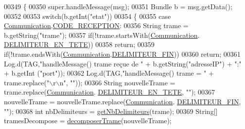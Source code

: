 \begin{DoxyCode}
00349         \{
00350             super.handleMessage(msg);
00351             Bundle b = msg.getData();
00352 
00353             \textcolor{keywordflow}{switch}(b.getInt(\textcolor{stringliteral}{"etat"}))
00354             \{
00355                 \textcolor{keywordflow}{case} \hyperlink{classcom_1_1lasalle_1_1meeting_1_1_communication}{Communication}.\hyperlink{classcom_1_1lasalle_1_1meeting_1_1_communication_a9cd85019614f2434af944c955519dfd1}{CODE\_RECEPTION}:
00356                     String trame = b.getString(\textcolor{stringliteral}{"trame"});
00357                     \textcolor{keywordflow}{if}(!trame.startsWith(\hyperlink{classcom_1_1lasalle_1_1meeting_1_1_communication}{Communication}.
      \hyperlink{classcom_1_1lasalle_1_1meeting_1_1_communication_a6560c39bb7ebc968e007e4dd98ec296c}{DELIMITEUR\_EN\_TETE}))
00358                         \textcolor{keywordflow}{return};
00359                     \textcolor{keywordflow}{if}(!trame.endsWith(\hyperlink{classcom_1_1lasalle_1_1meeting_1_1_communication}{Communication}.\hyperlink{classcom_1_1lasalle_1_1meeting_1_1_communication_a6f2e7cb2145496069cdf1b33d017be58}{DELIMITEUR\_FIN}))
00360                         \textcolor{keywordflow}{return};
00361                     Log.d(TAG,\textcolor{stringliteral}{"handleMessage() trame reçue de "} + b.getString(\textcolor{stringliteral}{"adresseIP"}) + \textcolor{stringliteral}{":"} + b.getInt
      (\textcolor{stringliteral}{"port"}));
00362                     Log.d(TAG,\textcolor{stringliteral}{"handleMessage() trame = "} + trame.replace(\textcolor{stringliteral}{"\(\backslash\)r\(\backslash\)n"}, \textcolor{stringliteral}{""}));
00366                     String nouvelleTrame = trame.replace(\hyperlink{classcom_1_1lasalle_1_1meeting_1_1_communication}{Communication}.
      \hyperlink{classcom_1_1lasalle_1_1meeting_1_1_communication_a6560c39bb7ebc968e007e4dd98ec296c}{DELIMITEUR\_EN\_TETE}, \textcolor{stringliteral}{""});
00367                     nouvelleTrame = nouvelleTrame.replace(\hyperlink{classcom_1_1lasalle_1_1meeting_1_1_communication}{Communication}.
      \hyperlink{classcom_1_1lasalle_1_1meeting_1_1_communication_a6f2e7cb2145496069cdf1b33d017be58}{DELIMITEUR\_FIN}, \textcolor{stringliteral}{""});
00368                     \textcolor{keywordtype}{int} nbDelimiteurs = \hyperlink{classcom_1_1lasalle_1_1meeting_1_1_main_activity_a0c5fe341f52a9db09401885878883663}{getNbDelimiteurs}(trame);
00369                     String[] tramesDecompose = \hyperlink{classcom_1_1lasalle_1_1meeting_1_1_main_activity_ab9a644c245dafa25dc2ef9d099565425}{decomposerTrame}(nouvelleTrame);

\end{DoxyCode}
